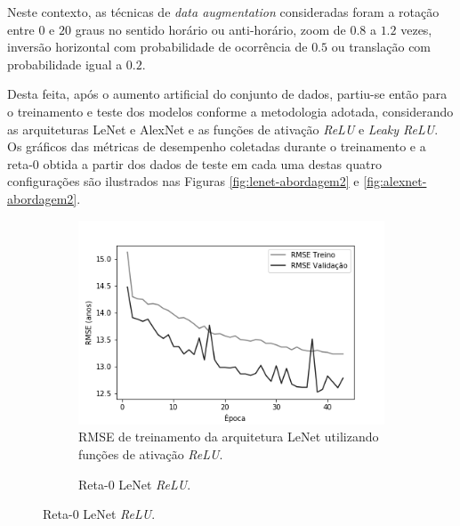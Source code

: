 	Neste contexto, as técnicas de \emph{data augmentation} consideradas foram a rotação entre $0$ e $20$ graus no sentido horário ou anti-horário, zoom de $0.8$ a $1.2$ vezes, inversão horizontal com probabilidade de ocorrência de $0.5$ ou translação com probabilidade igual a $0.2$.

	Desta feita, após o aumento artificial do conjunto de dados, partiu-se então para o treinamento e teste dos modelos conforme a metodologia adotada, considerando as arquiteturas LeNet e AlexNet e as funções de ativação \emph{ReLU} e \emph{Leaky ReLU}. Os gráficos das métricas de desempenho coletadas durante o treinamento e a reta-0 obtida a partir dos dados de teste em cada uma destas quatro configurações são ilustrados nas Figuras \ref{fig:lenet-abordagem2} e \ref{fig:alexnet-abordagem2}.

	\begin{figure}[hb!]
		\caption{Resultados do treinamento e teste da CNN LeNet de acordo com a Abordagem 2.}\label{fig:lenet-abordagem2}
		\begin{subfigure}[hb]{0.5\linewidth}
			\caption{RMSE de treinamento da arquitetura LeNet utilizando funções de ativação \emph{ReLU}.}
			\includegraphics[width=\linewidth]{img/graficos/history/lenet/fig-history-image-treat-2-lenet-relu-rmse.png}%
		\end{subfigure}%
		\begin{subfigure}[hb]{0.5\linewidth}
			\caption{Reta-0 LeNet \emph{ReLU}.}

\end{subfigure}
\end{figure}
